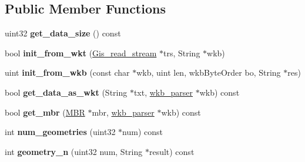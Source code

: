 \subsection*{Public Member Functions}
\begin{DoxyCompactItemize}
\item 
\mbox{\label{classGis__multi__line__string_aa4c010a4ff168327c066fda03a7f098b}} 
uint32 {\bfseries get\+\_\+data\+\_\+size} () const
\item 
\mbox{\label{classGis__multi__line__string_afcb4e3852e54ec2ddba1d541887d0639}} 
bool {\bfseries init\+\_\+from\+\_\+wkt} (\mbox{\hyperlink{classGis__read__stream}{Gis\+\_\+read\+\_\+stream}} $\ast$trs, String $\ast$wkb)
\item 
\mbox{\label{classGis__multi__line__string_aa863b0efd22d727dca5dbdc01f33103e}} 
uint {\bfseries init\+\_\+from\+\_\+wkb} (const char $\ast$wkb, uint len, wkb\+Byte\+Order bo, String $\ast$res)
\item 
\mbox{\label{classGis__multi__line__string_a047ef7f8a31fe75e743894cf9dbffd3e}} 
bool {\bfseries get\+\_\+data\+\_\+as\+\_\+wkt} (String $\ast$txt, \mbox{\hyperlink{classGeometry_1_1wkb__parser}{wkb\+\_\+parser}} $\ast$wkb) const
\item 
\mbox{\label{classGis__multi__line__string_a8f20adcf15a102c1f5ce8b3971050155}} 
bool {\bfseries get\+\_\+mbr} (\mbox{\hyperlink{structMBR}{M\+BR}} $\ast$mbr, \mbox{\hyperlink{classGeometry_1_1wkb__parser}{wkb\+\_\+parser}} $\ast$wkb) const
\item 
\mbox{\label{classGis__multi__line__string_a95a4c172a3f7eabbc6b546208f3a05fa}} 
int {\bfseries num\+\_\+geometries} (uint32 $\ast$num) const
\item 
\mbox{\label{classGis__multi__line__string_ac2024b9b51bc93ac8c3420b550459e8b}} 
int {\bfseries geometry\+\_\+n} (uint32 num, String $\ast$result) const
\item 
\mbox{\label{classGis__multi__line__string_af2d41d7e10950cb261c3d64b2e035a68}} 

\end{DoxyCompactItemize}
